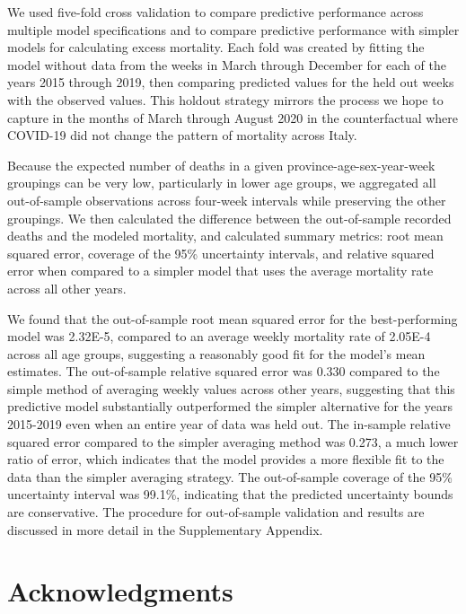 \documentclass[
]{article}
\begin{document}
We used five-fold cross validation to compare predictive performance across multiple model specifications and to compare predictive performance with simpler models for calculating excess mortality. Each fold was created by fitting the model without data from the weeks in March through December for each of the years 2015 through 2019, then comparing predicted values for the held out weeks with the observed values. This holdout strategy mirrors the process we hope to capture in the months of March through August 2020 in the counterfactual where COVID-19 did not change the pattern of mortality across Italy.

Because the expected number of deaths in a given province-age-sex-year-week groupings can be very low, particularly in lower age groups, we aggregated all out-of-sample observations across four-week intervals while preserving the other groupings. We then calculated the difference between the out-of-sample recorded deaths and the modeled mortality, and calculated summary metrics: root mean squared error, coverage of the 95\% uncertainty intervals, and relative squared error when compared to a simpler model that uses the average mortality rate across all other years.

We found that the out-of-sample root mean squared error for the best-performing model was 2.32E-5, compared to an average weekly mortality rate of 2.05E-4 across all age groups, suggesting a reasonably good fit for the model's mean estimates. The out-of-sample relative squared error was 0.330 compared to the simple method of averaging weekly values across other years, suggesting that this predictive model substantially outperformed the simpler alternative for the years 2015-2019 even when an entire year of data was held out. The in-sample relative squared error compared to the simpler averaging method was 0.273, a much lower ratio of error, which indicates that the model provides a more flexible fit to the data than the simpler averaging strategy. The out-of-sample coverage of the 95\% uncertainty interval was 99.1\%, indicating that the predicted uncertainty bounds are conservative. The procedure for out-of-sample validation and results are discussed in more detail in the Supplementary Appendix.

\hypertarget{acknowledgments}{%
\section{Acknowledgments}\label{acknowledgments}}
\end{document}
